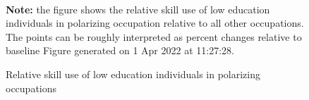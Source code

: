 \begin{figure}[!h]
\centering
\caption{Relative skill use of low education individuals in polarizing occupations}
\label{fig:relative_use}
  \\ 
\par \begin{minipage}[h]{\textwidth}{\scriptsize\textbf{Note:} the figure shows the relative skill use of low education individuals in polarizing occupation relative to all other occupations. The points can be roughly interpreted as percent changes relative to baseline Figure generated on  1 Apr 2022 at 11:27:28.}\end{minipage}
\end{figure}

